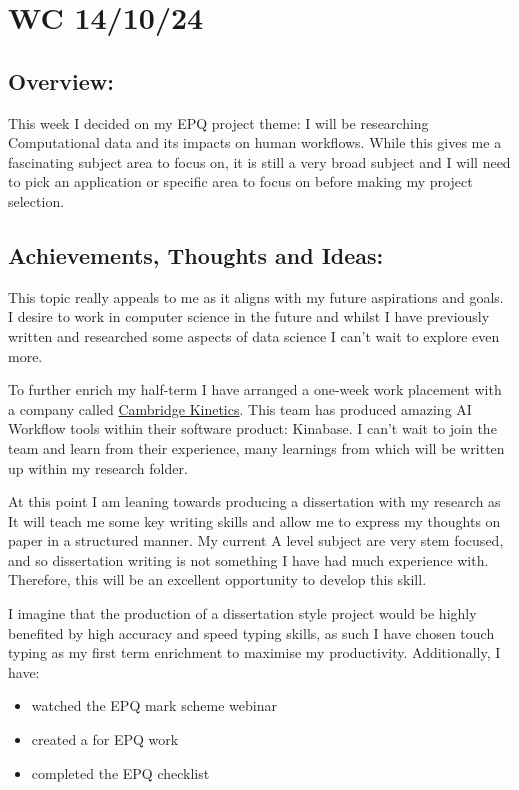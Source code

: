\section{WC 14/10/24}

\subsection*{Overview:}
This week I decided on my EPQ project theme: I will be researching Computational data and its impacts on human workflows. While this gives me a fascinating subject area to focus on, it is still a very broad subject and I will need to pick an application or specific area to focus on before making my project selection.

\subsection*{Achievements, Thoughts and Ideas:}
This topic really appeals to me as it aligns with my future aspirations and goals. I desire to work in computer science in the future and whilst I have previously written and researched some aspects of data science I can't wait to explore even more. 

To further enrich my half-term I have arranged a one-week work placement with a company called \href{https://www.cambridgekinetics.com}{Cambridge Kinetics}. This team has produced amazing AI Workflow tools within their software product: Kinabase. I can't wait to join the team and learn from their experience, many learnings from which will be written up within my research folder.

At this point I am leaning towards producing a dissertation with my research as It will teach me some key writing skills and allow me to express my thoughts on paper in a structured manner. My current A level subject are very stem focused, and so dissertation writing is not something I have had much experience with. Therefore, this will be an excellent opportunity to develop this skill.

I imagine that the production of a dissertation style project would be highly benefited by high accuracy and speed typing skills, as such I have chosen touch typing as my first term enrichment to maximise my productivity.
Additionally, I have:
\begin{itemize}
    \item watched the EPQ mark scheme webinar
    \item created a  for EPQ work
    \item completed the EPQ checklist
\end{itemize}

